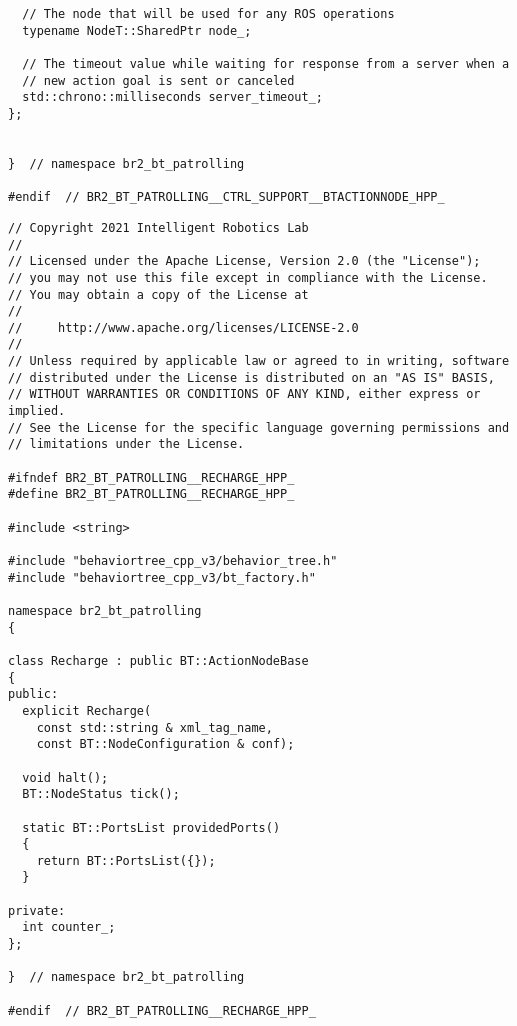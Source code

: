 \begin{tcolorbox}[sharp corners, colframe=gray!80, colback=LightGray, left=0pt, top=0pt, bottom=0pt, title=\texttt{br2\_bt\_patrolling/include/br2\_bt\_patrolling/ctrl\_support/BTActionNode.hpp}]
\begin{verbatim}
  // The node that will be used for any ROS operations
  typename NodeT::SharedPtr node_;

  // The timeout value while waiting for response from a server when a
  // new action goal is sent or canceled
  std::chrono::milliseconds server_timeout_;
};


}  // namespace br2_bt_patrolling

#endif  // BR2_BT_PATROLLING__CTRL_SUPPORT__BTACTIONNODE_HPP_
    \end{verbatim}
    \end{tcolorbox}
  \normalsize

 \footnotesize
\begin{tcolorbox}[sharp corners, colframe=gray!80, colback=LightGray, left=0pt, top=0pt, bottom=0pt, title=\texttt{br2\_bt\_patrolling/include/br2\_bt\_patrolling/Recharge.hpp}]
  \begin{verbatim}
// Copyright 2021 Intelligent Robotics Lab
//
// Licensed under the Apache License, Version 2.0 (the "License");
// you may not use this file except in compliance with the License.
// You may obtain a copy of the License at
//
//     http://www.apache.org/licenses/LICENSE-2.0
//
// Unless required by applicable law or agreed to in writing, software
// distributed under the License is distributed on an "AS IS" BASIS,
// WITHOUT WARRANTIES OR CONDITIONS OF ANY KIND, either express or implied.
// See the License for the specific language governing permissions and
// limitations under the License.

#ifndef BR2_BT_PATROLLING__RECHARGE_HPP_
#define BR2_BT_PATROLLING__RECHARGE_HPP_

#include <string>

#include "behaviortree_cpp_v3/behavior_tree.h"
#include "behaviortree_cpp_v3/bt_factory.h"

namespace br2_bt_patrolling
{

class Recharge : public BT::ActionNodeBase
{
public:
  explicit Recharge(
    const std::string & xml_tag_name,
    const BT::NodeConfiguration & conf);

  void halt();
  BT::NodeStatus tick();

  static BT::PortsList providedPorts()
  {
    return BT::PortsList({});
  }

private:
  int counter_;
};

}  // namespace br2_bt_patrolling

#endif  // BR2_BT_PATROLLING__RECHARGE_HPP_
    \end{verbatim}
    \end{tcolorbox}
  \normalsize

